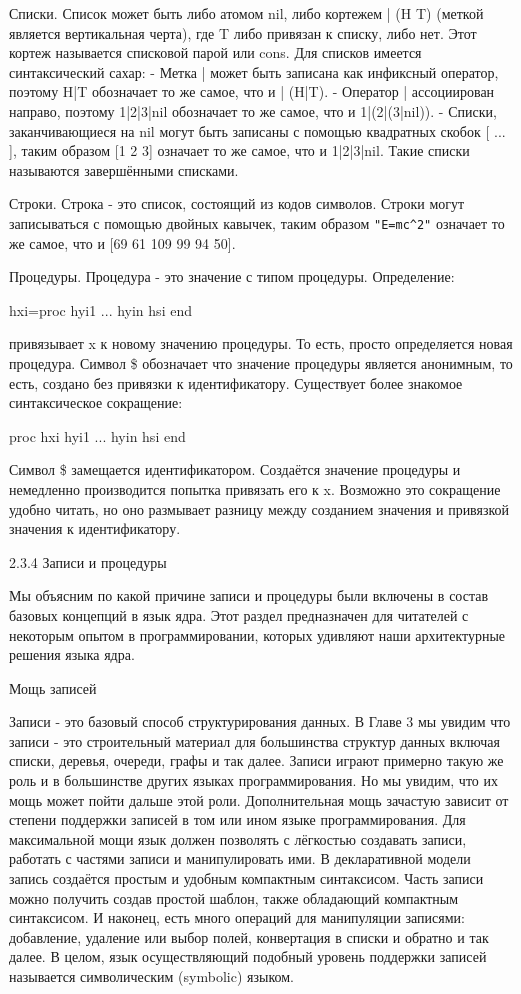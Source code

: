 Списки. Список может быть либо атомом nil, либо кортежем  | (H T) (меткой является вертикальная черта), где T либо привязан к списку, либо нет. Этот кортеж называется списковой парой или cons. Для списков имеется синтаксический сахар:
- Метка  |  может быть записана как инфиксный оператор, поэтому H|T обозначает то же самое, что и  | (H|T).
- Оператор  |  ассоциирован направо, поэтому 1|2|3|nil обозначает то же самое, что и 1|(2|(3|nil)).
- Списки, заканчивающиеся на nil могут быть записаны с помощью квадратных скобок [ ... ], таким образом [1 2 3] означает то же самое, что и 1|2|3|nil. Такие списки называются завершёнными списками.

Строки. Строка - это список, состоящий из кодов символов. Строки могут записываться с помощью двойных кавычек, таким образом \lstinline|"E=mc^2"| означает то же самое, что и [69 61 109 99 94 50].

Процедуры. Процедура - это значение с типом процедуры. Определение:

hxi=proc { hyi1 ... hyin } hsi end

привязывает x к новому значению процедуры. То есть, просто определяется новая процедура. Символ \$ обозначает что значение процедуры является анонимным, то есть, создано без привязки к идентификатору. Существует более знакомое синтаксическое сокращение:

proc { hxi hyi1 ... hyin } hsi end

Символ \$ замещается идентификатором. Создаётся значение процедуры и немедленно производится попытка привязать его к x. Возможно это сокращение удобно читать, но оно размывает разницу между созданием значения и привязкой значения к идентификатору.

2.3.4 Записи и процедуры

Мы объясним по какой причине записи и процедуры были включены в состав базовых концепций в язык ядра. Этот раздел предназначен для читателей с некоторым опытом в программировании, которых удивляют наши архитектурные решения языка ядра.

Мощь записей

Записи - это базовый способ структурирования данных. В Главе 3 мы увидим что записи - это строительный материал для большинства структур данных включая списки, деревья, очереди, графы и так далее. Записи играют примерно такую же роль и в большинстве других языках программирования. Но мы увидим, что их мощь может пойти дальше этой роли. Дополнительная мощь зачастую зависит от степени поддержки записей в том или ином языке программирования. Для максимальной мощи язык должен позволять с лёгкостью создавать записи, работать с частями записи и манипулировать ими. В декларативной модели запись создаётся простым и удобным компактным синтаксисом. Часть записи можно получить создав простой шаблон, также обладающий компактным синтаксисом. И наконец, есть много операций для манипуляции записями: добавление, удаление или выбор полей, конвертация в списки и обратно и так далее. В целом, язык осуществляющий подобный уровень поддержки записей называется символическим (symbolic) языком.

